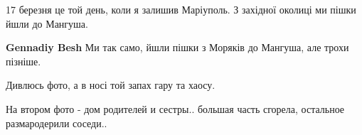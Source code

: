  
 
 
 
 

\qqSecCmt


17 березня це той день, коли я залишив Маріуполь. З західної околиці ми пішки
йшли до Мангуша.

\begin{itemize} %
\textbf{Gennadiy Besh} Ми так само, йшли пішки з Моряків до Мангуша, але трохи пізніше.
\end{itemize} %


Дивлюсь фото, а в носі той запах гару та хаосу.


На втором фото - дом родителей и сестры.. большая часть сгорела, остальное размародерили соседи..
